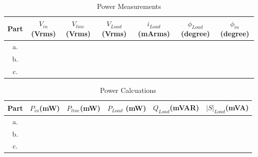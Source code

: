\documentclass[letterpaper,12pt]{article}
\begin{document}
\begin{table}[H]
    \begin{center}
        \caption{Power Measurements}
        \vspace{2mm}
        \begin{tabular}{||c | c | c | c | c | c | c ||} 
            \hline
            Part & \(V_{in}\)\newline (Vrms) & \(V_{line}\)\newline (Vrms) & \(V_{Load}\) \newline (Vrms) &\(i_{Load}\)\newline (mArms) & \(\phi_{Load}\)\newline(degree) &\(\phi_{in}\)\newline(degree)  \\ [0.5ex] 
            \hline\hline
            a. & &  & & & &   \\ 
            \hline
            b. & &  & & & &    \\
            \hline
            c. & &  & & & &   \\ [1ex] 
            \hline
        \end{tabular}
\end{center}
\end{table}


\begin{table}[H]
    \begin{center}
        \caption{Power Calcuations}
        \vspace{2mm}
        \begin{tabular}{||c | c | c | c | c | c ||} 
            \hline
            Part & \(P_{in}\)\newline (mW) & \(P_{line}\)\newline (mW) & \(P_{Load}\) \newline (mW) &\(Q_{Load}\)\newline (mVAR) & \(|S|_{Load}\)\newline(mVA)   \\ [0.5ex] 
            \hline\hline
            a. & &  & & &    \\ 
            \hline
            b. & &  & & &     \\
            \hline
            c. & &  & & &    \\ [1ex] 
            \hline
        \end{tabular}
\end{center}
\end{table}
\end{document}
